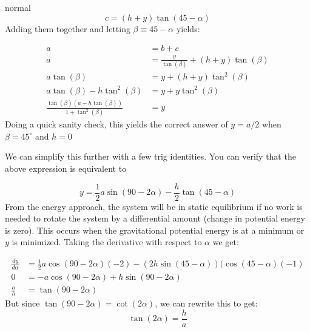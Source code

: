 \begin{solution}{normal}
$$c = (h+y)\tan(45-\alpha)$$Adding them together and letting $\beta \equiv 45 - \alpha$ yields:

\begin{align*}
a &= b + c \\
a &= \frac{y}{\tan(\beta)} + (h+y)\tan(\beta) \\
a\tan(\beta) &= y + (h+y)\tan^2(\beta) \\
a\tan(\beta) - h\tan^2(\beta) &= y + y\tan^2(\beta) \\
\frac{\tan(\beta)(a-h\tan(\beta))}{1+\tan^2(\beta)} &= y
\end{align*}Doing a quick sanity check, this yields the correct answer of $y=a/2$ when $\beta = 45^\circ$ and $h=0$

We can simplify this further with a few trig identities. You can verify that the above expression is equivalent to

$$ y = \frac{1}{2}a\sin(90-2\alpha) - \frac{h}{2}\tan(45-\alpha) $$From the energy approach, the system will be in static equilibrium if no work is needed to rotate the system by a differential amount (change in potential energy is zero). This occurs when the gravitational potential energy is at a minimum or $y$ is minimized. Taking the derivative with respect to $\alpha$ we get:

\begin{align*}
\frac{dy}{d\alpha} &= \frac{1}{2}a\cos(90-2\alpha)(-2) - (2h\sin(45-\alpha))(\cos(45-\alpha)(-1) \\
0 &= -a\cos(90-2\alpha) + h\sin(90-2\alpha) \\
\frac{a}{h} &= \tan(90-2\alpha)
\end{align*}But since $\tan(90-2\alpha) = \cot(2\alpha)$, we can rewrite this to get:
$$\tan(2\alpha) = \frac{h}{a}$$
\end{solution}
